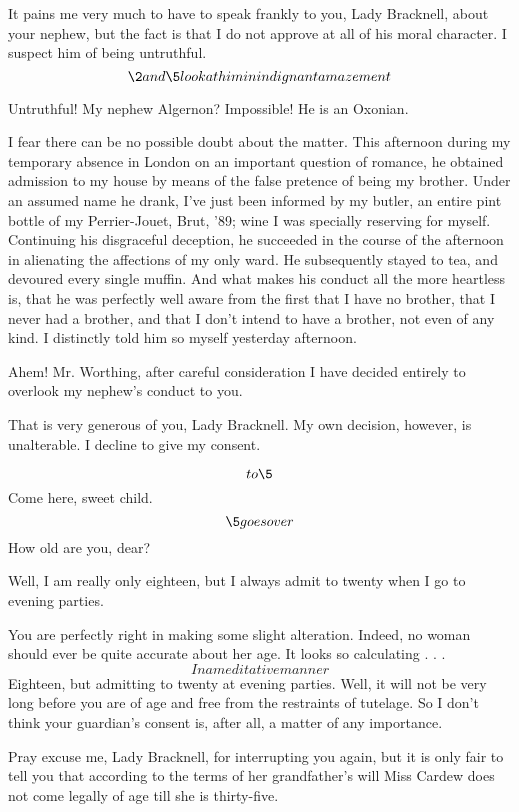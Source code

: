 \documentclass{book}
\begin{document}
\1  It pains me very much to have to speak frankly to you, Lady
Bracknell, about your nephew, but the fact is that I do not approve
at all of his moral character.  I suspect him of being untruthful.
\[\2 and \5 look at him in indignant amazement\]

\3  Untruthful!  My nephew Algernon?  Impossible!  He
is an Oxonian.

\1  I fear there can be no possible doubt about the matter.
This afternoon during my temporary absence in London on an
important question of romance, he obtained admission to my house by
means of the false pretence of being my brother.  Under an assumed
name he drank, I've just been informed by my butler, an entire pint
bottle of my Perrier-Jouet, Brut, '89; wine I was specially
reserving for myself.  Continuing his disgraceful deception, he
succeeded in the course of the afternoon in alienating the
affections of my only ward.  He subsequently stayed to tea, and
devoured every single muffin.  And what makes his conduct all the
more heartless is, that he was perfectly well aware from the first
that I have no brother, that I never had a brother, and that I
don't intend to have a brother, not even of any kind.  I distinctly
told him so myself yesterday afternoon.

\3  Ahem!  Mr. Worthing, after careful consideration I
have decided entirely to overlook my nephew's conduct to you.

\1  That is very generous of you, Lady Bracknell.  My own
decision, however, is unalterable.  I decline to give my consent.

\3  \[to \5\]  Come here, sweet child.  \[\5
goes over\]  How old are you, dear?

\5  Well, I am really only eighteen, but I always admit to
twenty when I go to evening parties.

\3  You are perfectly right in making some slight
alteration.  Indeed, no woman should ever be quite accurate about
her age.  It looks so calculating . . . \[In a meditative manner\]
Eighteen, but admitting to twenty at evening parties.  Well, it
will not be very long before you are of age and free from the
restraints of tutelage.  So I don't think your guardian's consent
is, after all, a matter of any importance.

\1  Pray excuse me, Lady Bracknell, for interrupting you again,
but it is only fair to tell you that according to the terms of her
grandfather's will Miss Cardew does not come legally of age till
she is thirty-five.
\end{document}
